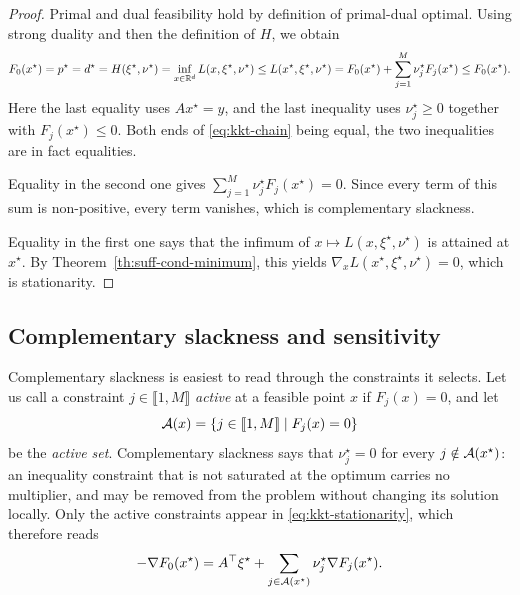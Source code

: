      \begin{proof}
         Primal and dual feasibility hold by definition of primal-dual optimal. Using strong duality and then the definition of $H$, we obtain
         \begin{equation}
             \label{eq:kkt-chain}
             F_0(x^\star) = p^\star = d^\star = H(\xi^\star,\nu^\star)
             = \inf_{x\in\mathbb{R}^d} L(x,\xi^\star,\nu^\star)
             \le L(x^\star,\xi^\star,\nu^\star)
             = F_0(x^\star) + \sum_{j=1}^M \nu_j^\star F_j(x^\star)
             \le F_0(x^\star).
         \end{equation}
         Here the last equality uses $Ax^\star=y$, and the last inequality uses $\nu_j^\star\ge0$ together with $F_j(x^\star)\le 0$. Both ends of \eqref{eq:kkt-chain} being equal, the two inequalities are in fact equalities.

         Equality in the second one gives $\sum_{j=1}^M \nu_j^\star F_j(x^\star) = 0$. Since every term of this sum is non-positive, every term vanishes, which is complementary slackness.

         Equality in the first one says that the infimum of $x\mapsto L(x,\xi^\star,\nu^\star)$ is attained at $x^\star$. By Theorem~\ref{th:suff-cond-minimum}, this yields $\nabla_x L(x^\star,\xi^\star,\nu^\star)=0$, which is stationarity.
     \end{proof}

     \subsection{Complementary slackness and sensitivity}

     Complementary slackness is easiest to read through the constraints it selects. Let us call a constraint $j\in\llbracket1,M\rrbracket$ \emph{active} at a feasible point $x$ if $F_j(x)=0$, and let
     \begin{equation}
         \mathcal{A}(x) = \{ j\in \llbracket 1,M\rrbracket \mid F_j(x)=0 \}
     \end{equation}
     be the \emph{active set}. Complementary slackness says that $\nu_j^\star=0$ for every $j\notin \mathcal{A}(x^\star)$: an inequality constraint that is not saturated at the optimum carries no multiplier, and may be removed from the problem without changing its solution locally. Only the active constraints appear in \eqref{eq:kkt-stationarity}, which therefore reads
     \begin{equation}
         \label{eq:kkt-active}
         -\nabla F_0(x^\star) = A^\top \xi^\star + \sum_{j\in \mathcal{A}(x^\star)} \nu_j^\star \nabla F_j(x^\star).
     \end{equation}

